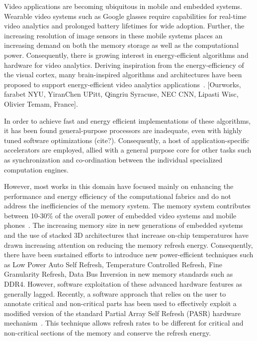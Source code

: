 Video applications are becoming ubiquitous in mobile and embedded systems. Wearable video systems such as Google glasses require capabilities for real-time video analytics and prolonged battery lifetimes for wide adoption.  Further, the increasing resolution of image sensors in these mobile systems places an increasing demand on both the memory storage as well as the computational power. Consequently, there is growing interest in energy-efficient algorithms and hardware for video analytics. 
Deriving inspiration from the energy-efficiency of the visual cortex, many brain-inspired algorithms and architectures have been proposed to support energy-efficient video analytics applications~\cite{Nere2011,Chen2014,Kestur2012,Maashri2012a}. [Ourworks, farabet NYU, YiranChen UPitt, Qingriu Syracuse, NEC CNN, Lipasti Wisc, Olivier Temam, France]. 

In order to achieve fast and energy efficient implementations of these algorithms, it has been found general-purpose processors are inadequate, even with highly tuned software optimizations (cite?). Consequently, a host of application-specific accelerators are employed, allied with a general purpose core for other tasks such as synchronization and co-ordination between the individual specialized computation engines.

However, most works in this domain have focused mainly on enhancing the performance and energy efficiency of the computational fabrics and do not address the inefficiencies of the memory system. The memory system contributes between 10-30\% of the overall power of embedded video systems and mobile phones~\cite{CarrollAaronHeiser2010}. The increasing memory size in new generations of embedded systems and the use of stacked 3D architectures that increase on-chip temperatures have drawn increasing attention on reducing the memory refresh energy. Consequently, there have been sustained efforts to introduce new power-efficient techniques such as Low Power Auto Self Refresh, Temperature Controlled Refresh, Fine Granularity Refresh, Data Bus Inversion in new memory standards such as DDR4.  However, software exploitation of these advanced hardware features as generally lagged. Recently, a software approach that relies on the user to annotate critical and non-critical parts has been used to effectively exploit a modified version of the standard Partial Array Self Refresh (PASR) hardware mechanism~\cite{Liu2011}. This technique allows refresh rates to be different for critical and non-critical sections of the memory and conserve the refresh energy. 

